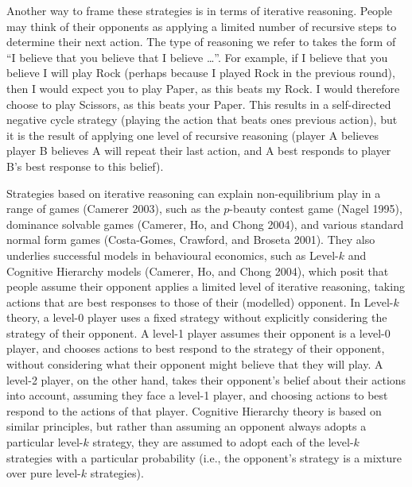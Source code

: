 \documentclass[smallextended]{svjour3}       %
\begin{document}
Another way to frame these strategies is in terms of iterative
reasoning. People may think of their opponents as applying a limited
number of recursive steps to determine their next action. The type of
reasoning we refer to takes the form of ``I believe that you believe
that I believe \ldots{}''. For example, if I believe that you believe I
will play Rock (perhaps because I played Rock in the previous round),
then I would expect you to play Paper, as this beats my Rock. I would
therefore choose to play Scissors, as this beats your Paper. This
results in a self-directed negative cycle strategy (playing the action
that beats ones previous action), but it is the result of applying one
level of recursive reasoning (player A believes player B believes A will
repeat their last action, and A best responds to player B's best
response to this belief).

Strategies based on iterative reasoning can explain non-equilibrium play
in a range of games (Camerer 2003), such as the \(p\)-beauty contest
game (Nagel 1995), dominance solvable games (Camerer, Ho, and Chong
2004), and various standard normal form games (Costa-Gomes, Crawford,
and Broseta 2001). They also underlies successful models in behavioural
economics, such as Level-\(k\) and Cognitive Hierarchy models (Camerer,
Ho, and Chong 2004), which posit that people assume their opponent
applies a limited level of iterative reasoning, taking actions that are
best responses to those of their (modelled) opponent. In Level-\(k\)
theory, a level-0 player uses a fixed strategy without explicitly
considering the strategy of their opponent. A level-1 player assumes
their opponent is a level-0 player, and chooses actions to best respond
to the strategy of their opponent, without considering what their
opponent might believe that they will play. A level-2 player, on the
other hand, takes their opponent's belief about their actions into
account, assuming they face a level-1 player, and choosing actions to
best respond to the actions of that player. Cognitive Hierarchy theory
is based on similar principles, but rather than assuming an opponent
always adopts a particular level-\(k\) strategy, they are assumed to
adopt each of the level-\(k\) strategies with a particular probability
(i.e., the opponent's strategy is a mixture over pure level-\(k\)
strategies).
\end{document}
